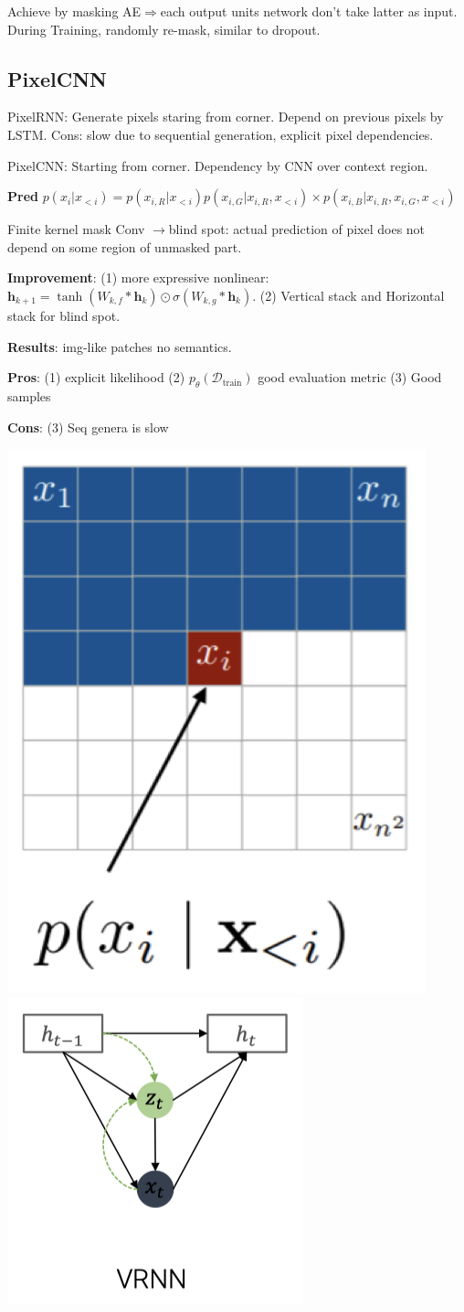 Achieve by masking AE\(\Rightarrow\)each output units network don't take latter as input. During Training, randomly re-mask, similar to dropout.


\subsection*{PixelCNN}

PixelRNN: Generate pixels staring from corner. Depend on previous pixels by LSTM. Cons: slow due to sequential generation, explicit pixel dependencies.

PixelCNN: Starting from corner. Dependency by CNN over context region.

\textbf{Pred} \(p(x_{i} | x_{<i})=p(x_{i, R} | x_{<i}) p(x_{i, G} | x_{i, R}, x_{<i}) \times p(x_{i, B} | x_{i, R}, x_{i, G}, x_{<i})\)

Finite kernel mask Conv \(\to\)blind spot: actual prediction of pixel does not depend on some region of unmasked part.

\textbf{Improvement}:
(1) more expressive nonlinear: \(\mathbf{h}_{k+1}=\tanh (W_{k, f} * \mathbf{h}_{k}) \odot \sigma(W_{k, g} * \mathbf{h}_{k})\).
(2) Vertical stack and Horizontal stack for blind spot.

\textbf{Results}: img-like patches no semantics.

\textbf{Pros}: (1) explicit likelihood (2) \(p_{\theta}(\mathcal{D}_{\text{train}})\) good evaluation metric (3) Good samples

\textbf{Cons}: (3) Seq genera is slow

\begin{center}
    \includegraphics[width=0.3\columnwidth]{figures/pixelcnn.png}
    \includegraphics[width=0.4\columnwidth]{figures/VRNN.png}
\end{center}

